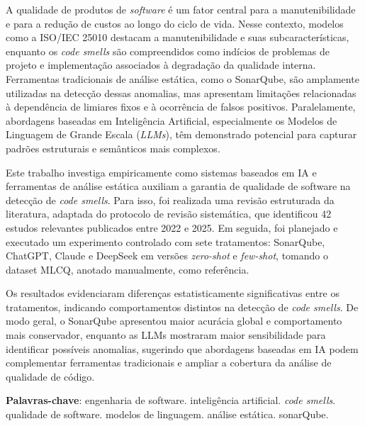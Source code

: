 \begin{resumo}
 A qualidade de produtos de \textit{software} é um fator central para a manutenibilidade e para a redução de custos ao longo do ciclo de vida. Nesse contexto, modelos como a ISO/IEC 25010 destacam a manutenibilidade e suas subcaracterísticas, enquanto os 
\textit{code smells} são compreendidos como indícios de problemas de projeto e implementação associados à degradação da qualidade interna. Ferramentas tradicionais de análise estática, como o SonarQube, são amplamente utilizadas na detecção dessas anomalias, mas apresentam limitações relacionadas à dependência de limiares fixos e à ocorrência de falsos positivos. Paralelamente, abordagens baseadas em Inteligência Artificial, especialmente os Modelos de Linguagem de Grande Escala (\textit{LLMs}), têm demonstrado potencial para capturar padrões estruturais e semânticos mais complexos.

Este trabalho investiga empiricamente como sistemas baseados em IA e ferramentas de análise estática auxiliam a garantia de qualidade de software na detecção de \textit{code smells}. Para isso, foi realizada uma revisão estruturada da literatura, adaptada do protocolo de revisão sistemática, que identificou 42 estudos relevantes publicados entre 2022 e 2025. Em seguida, foi planejado e executado um experimento controlado com sete tratamentos: SonarQube, ChatGPT, Claude e DeepSeek em versões \textit{zero-shot} e \textit{few-shot}, tomando o dataset MLCQ, anotado manualmente, como referência.

Os resultados evidenciaram diferenças estatisticamente significativas entre os tratamentos, indicando comportamentos distintos na detecção de \textit{code smells}. De modo geral, o SonarQube apresentou maior acurácia global e comportamento mais conservador, enquanto as LLMs mostraram maior sensibilidade para identificar possíveis anomalias, sugerindo que abordagens baseadas em IA podem complementar ferramentas tradicionais e ampliar a cobertura da análise de qualidade de código.

 \vspace{\onelineskip}
    
 \noindent
 \textbf{Palavras-chave}: engenharia de software. inteligência artificial. 	\textit{code smells}. qualidade de software. modelos de linguagem. análise estática. sonarQube.
\end{resumo}
